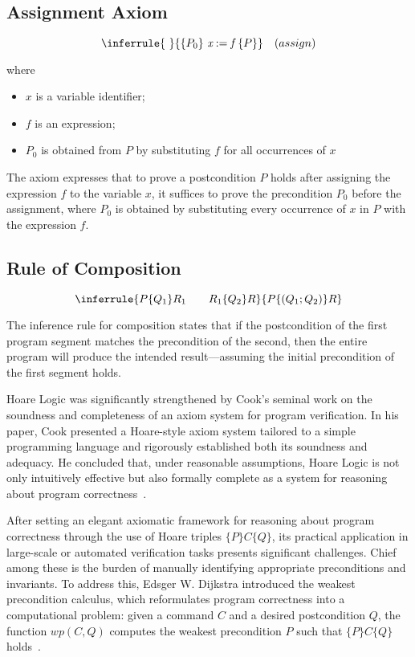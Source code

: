 \subsection{Assignment Axiom}

\[ 
  \inferrule
  { \ }
  {\{P_0\} \ \textit{x} := \textit{f} \ \{P\}}
  \quad (assign)
\]

where
\begin{itemize}
\item{$x$ is a variable identifier;}
\item{$f$ is an expression;}
\item{$P_0$ is obtained from $P$ by substituting $f$ for all occurrences of $x$}
\end{itemize}

The axiom expresses that to prove a postcondition $P$ holds after assigning the expression $f$ to the variable $x$,
it suffices to prove the precondition $P_0$ before the assignment, where $P_0$ is obtained by substituting every occurrence of
$x$ in $P$ with the expression $f$.

\subsection{Rule of Composition}

\[ 
  \inferrule
  {P \{ Q_1 \} R_1 \quad \quad  R_1 \{ Q_2 \} R}
  {P \{ (Q_1 ; Q_2) \} R} 
\]

The inference rule for composition states that if the postcondition of the first program segment matches the precondition 
of the second, then the entire program will produce the intended result—assuming the initial precondition of the first 
segment holds.

Hoare Logic was significantly strengthened by Cook's seminal work on the soundness and completeness of an axiom system 
for program verification. In his paper, Cook presented a Hoare-style axiom system tailored to a simple programming language 
and rigorously established both its soundness and adequacy. He concluded that, under reasonable assumptions, Hoare Logic is 
not only intuitively effective but also formally complete as a system for reasoning about program correctness~\cite{0207005}.

After setting an elegant axiomatic framework for reasoning about program correctness through the use of Hoare triples 
$\{P\}C\{Q\}$, its practical application in large-scale or automated verification tasks presents significant challenges. 
Chief among these is the burden of manually identifying appropriate preconditions and invariants. To address this, 
Edsger W. Dijkstra introduced the weakest precondition calculus, which reformulates program correctness into a computational 
problem: given a command $C$ and a desired postcondition $Q$, the function $wp(C,Q)$ computes the weakest precondition $P$ 
such that $\{P\}C\{Q\}$ holds~\cite{Dijkstra76}.

